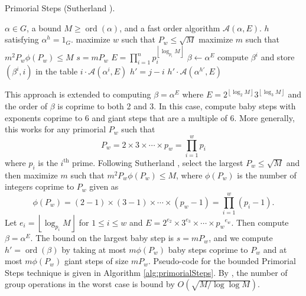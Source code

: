 \documentclass{ucalgthes1}
\theoremstyle{definition}
\DeclareMathOperator{\ord}{ord}
\newcommand{\floor}[1]{\left\lfloor #1 \right\rfloor}
\begin{document}
\begin{algorithm}[htb]
\caption{Primorial Steps (Sutherland \cite[p.57]{Sutherland2007}).}
\label{alg:primorialSteps}
\begin{algorithmic}[1]
\Require $\alpha \in G$, a bound $M \ge \ord(\alpha)$, and a fast order algorithm $\mathcal A(\alpha, E)$.
\Ensure $h$ satisfying $\alpha ^ h = 1_G$.
\State maximize $w$ such that $P_w \le \sqrt{M}$
\State maximize $m$ such that $m^2P_w\phi(P_w) \le M$
\State $s = mP_w$
\State $E = \prod_{i=1}^n p_i^{\floor{\log_{p_i} M}}$
\State $\beta \gets \alpha^E$
	\State compute $\beta^i$ and store $(\beta^i, i)$ in the table 
		\State \Return $i \cdot \mathcal A(\alpha^i, E)$
	\EndIf
\EndFor
{}
	 
		\State $h' = j - i$
		\State \Return $h' \cdot \mathcal A(\alpha^{h'}, E)$
	\EndIf
\EndFor
\end{algorithmic}
\end{algorithm}

This approach is extended to computing $\beta = \alpha^E$ where $E = 2^{\floor{\log_2 M}} 3^{\floor{\log_3 M}}$ and the order of $\beta$ is coprime to both 2 and 3.  In this case, compute baby steps with exponents coprime to 6 and giant steps that are a multiple of 6.  More generally, this works for any primorial $P_w$ such that
\[
	P_w = 2 \times 3 \times \cdots \times p_w = \prod_{i=1}^w p_i
\]
where $p_i$ is the $i^{\textrm{th}}$ prime.  Following Sutherland \cite[p.57]{Sutherland2007}, select the largest $P_w \le \sqrt{M}$ and then maximize $m$ such that $m^2P_w \phi(P_w) \le M$, where $\phi(P_w)$ is the number of integers coprime to $P_w$ given as
\begin{equation}
\label{eq:phiPrimorial}
	\phi(P_w) = (2-1) \times (3-1) \times \cdots \times (p_w - 1) = \prod_{i=1}^w (p_i - 1).
\end{equation}
Let $e_i = \floor{\log_{p_i} M}$ for $1 \le i \le w$ and $E = 2^{e_2} \times 3^{e_3} \times \cdots \times {p_w}^{e_w}$.  Then compute $\beta = \alpha^E$.  The bound on the largest baby step is $s = m P_w$, and we compute $h' = \ord(\beta)$ by taking at most $m \phi(P_w)$ baby steps coprime to $P_w$ and at most $m \phi(P_w)$ giant steps of size $m P_w$.  Pseudo-code for the bounded Primorial Steps technique is given in Algorithm \ref{alg:primorialSteps}.  By \cite[p.59~Proposition~4.2]{Sutherland2007}, the number of group operations in the worst case is bound by $O(\sqrt{M / \log \log M})$.
\end{document}
